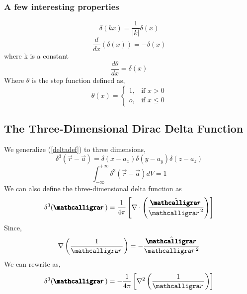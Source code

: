 \subsubsection{A few interesting properties}
\begin{equation}
\delta(kx) = \frac{1}{|k|}\delta(x)
\end{equation}
\begin{equation}
\frac{d}{dx}(\delta(x)) = -\delta(x)
\end{equation}
where k is a constant
\begin{equation}
\frac{d \theta}{dx} = \delta(x)
\end{equation}
Where $\theta$ is the step function defined as,
\begin{equation}
\theta(x)= 
\begin{cases}
1, & \text{if } x > 0\\
o,              & \text{if } x \leq 0
\end{cases}
\end{equation}

\subsection{The Three-Dimensional Dirac Delta Function}
We generalize (\ref{deltadef}) to three dimensions,
\begin{equation}
\delta^{3}(\vec{r} - \vec{a}) = \delta(x-a_{x})\delta(y-a_{y})\delta(z-a_{z})
\end{equation}
\begin{equation}
\int_{- \infty}^{+ \infty} \delta^{3}(\vec{r} - \vec{a}) dV = 1
\end{equation}
We can also define the three-dimensional delta function as
\begin{equation}
\delta^{3}(\boldscriptr) = \frac{1}{4 \pi} \left[\nabla \cdot \left( \frac{\hat{\boldscriptr}}{{\scriptr	}^{2}}\right)\right]
\end{equation}
Since,
$$\nabla \left(\frac{1}{\scriptr}\right) = -\frac{\hat{\boldscriptr}}{\scriptr^{2}}$$
We can rewrite as,
\begin{equation}
\delta^{3}(\boldscriptr) = -\frac{1}{4 \pi} \left[\nabla^{2}  \left( \frac{1}{\scriptr}\right)\right]
\end{equation}
